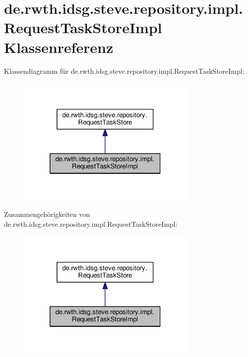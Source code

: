 \hypertarget{classde_1_1rwth_1_1idsg_1_1steve_1_1repository_1_1impl_1_1_request_task_store_impl}{\section{de.\+rwth.\+idsg.\+steve.\+repository.\+impl.\+Request\+Task\+Store\+Impl Klassenreferenz}
\label{classde_1_1rwth_1_1idsg_1_1steve_1_1repository_1_1impl_1_1_request_task_store_impl}
}


Klassendiagramm für de.\+rwth.\+idsg.\+steve.\+repository.\+impl.\+Request\+Task\+Store\+Impl\+:\nopagebreak
\begin{figure}[H]
\begin{center}
\leavevmode
\includegraphics[width=247pt]{classde_1_1rwth_1_1idsg_1_1steve_1_1repository_1_1impl_1_1_request_task_store_impl__inherit__graph}
\end{center}
\end{figure}


Zusammengehörigkeiten von de.\+rwth.\+idsg.\+steve.\+repository.\+impl.\+Request\+Task\+Store\+Impl\+:\nopagebreak
\begin{figure}[H]
\begin{center}
\leavevmode
\includegraphics[width=247pt]{classde_1_1rwth_1_1idsg_1_1steve_1_1repository_1_1impl_1_1_request_task_store_impl__coll__graph}
\end{center}
\end{figure}
